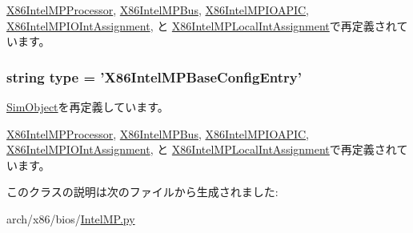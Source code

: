\hyperlink{classIntelMP_1_1X86IntelMPProcessor_a17da7064bc5c518791f0c891eff05fda}{X86IntelMPProcessor}, \hyperlink{classIntelMP_1_1X86IntelMPBus_a17da7064bc5c518791f0c891eff05fda}{X86IntelMPBus}, \hyperlink{classIntelMP_1_1X86IntelMPIOAPIC_a17da7064bc5c518791f0c891eff05fda}{X86IntelMPIOAPIC}, \hyperlink{classIntelMP_1_1X86IntelMPIOIntAssignment_a17da7064bc5c518791f0c891eff05fda}{X86IntelMPIOIntAssignment}, と \hyperlink{classIntelMP_1_1X86IntelMPLocalIntAssignment_a17da7064bc5c518791f0c891eff05fda}{X86IntelMPLocalIntAssignment}で再定義されています。\hypertarget{classIntelMP_1_1X86IntelMPBaseConfigEntry_acce15679d830831b0bbe8ebc2a60b2ca}{
\subsubsection[{type}]{\setlength{\rightskip}{0pt plus 5cm}string {\bf type} = '{\bf X86IntelMPBaseConfigEntry}'}}
\label{classIntelMP_1_1X86IntelMPBaseConfigEntry_acce15679d830831b0bbe8ebc2a60b2ca}


\hyperlink{classm5_1_1SimObject_1_1SimObject_acce15679d830831b0bbe8ebc2a60b2ca}{SimObject}を再定義しています。

\hyperlink{classIntelMP_1_1X86IntelMPProcessor_acce15679d830831b0bbe8ebc2a60b2ca}{X86IntelMPProcessor}, \hyperlink{classIntelMP_1_1X86IntelMPBus_acce15679d830831b0bbe8ebc2a60b2ca}{X86IntelMPBus}, \hyperlink{classIntelMP_1_1X86IntelMPIOAPIC_acce15679d830831b0bbe8ebc2a60b2ca}{X86IntelMPIOAPIC}, \hyperlink{classIntelMP_1_1X86IntelMPIOIntAssignment_acce15679d830831b0bbe8ebc2a60b2ca}{X86IntelMPIOIntAssignment}, と \hyperlink{classIntelMP_1_1X86IntelMPLocalIntAssignment_acce15679d830831b0bbe8ebc2a60b2ca}{X86IntelMPLocalIntAssignment}で再定義されています。

このクラスの説明は次のファイルから生成されました:\begin{DoxyCompactItemize}
\item 
arch/x86/bios/\hyperlink{IntelMP_8py}{IntelMP.py}\end{DoxyCompactItemize}
